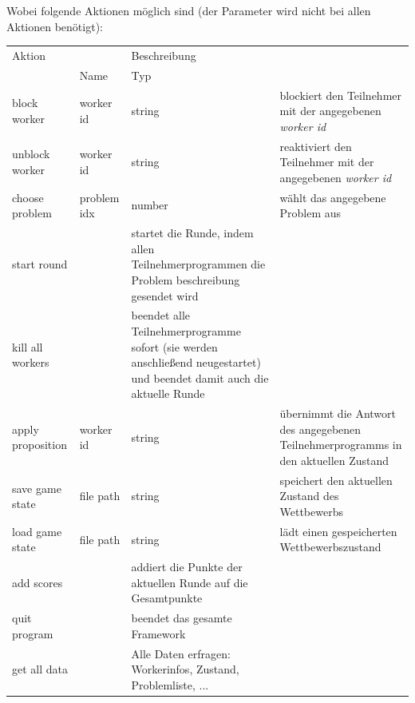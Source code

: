 \documentclass[a4paper, 12pt]{article}
\begin{document}
Wobei folgende Aktionen möglich sind (der Parameter wird nicht bei allen
Aktionen benötigt):
\par\begin{description}\item

\newcommand{\noparam}{\multicolumn{2}{c}{--- \textit{ohne Parameter} ---}}

\begin{tabularx}{\linewidth}{>{\ttfamily}l >{\ttfamily}l >{\ttfamily}l X}
  \normalfont Aktion & \multicolumn{2}{c}{Parameter} & Beschreibung \\
  & \normalfont Name & \normalfont Typ & \\
  \hline
  block worker      & worker id   & string & blockiert den Teilnehmer mit der
                                             angegebenen \textit{worker id} \\
  unblock worker    & worker id   & string & reaktiviert den Teilnehmer mit der
                                             angegebenen \textit{worker id} \\
  choose problem    & problem idx & number & wählt das angegebene Problem aus \\
  start round       & \noparam             & startet die Runde, indem allen
                                             Teilnehmerprogrammen die Problem\-%
                                             beschreibung gesendet wird \\
  kill all workers  & \noparam             & beendet alle Teilnehmerprogramme
                                             sofort (sie werden anschließend
                                             neugestartet) und beendet damit
                                             auch die aktuelle Runde \\
  apply proposition & worker id   & string & übernimmt die Antwort des
                                             angegebenen Teilnehmerprogramms in
                                             den aktuellen Zustand \\
  save game state   & file path   & string & speichert den aktuellen Zustand des
                                             Wettbewerbs \\
  load game state   & file path   & string & lädt einen gespeicherten
                                             Wettbewerbszustand \\
  add scores        & \noparam             & addiert die Punkte der aktuellen
                                             Runde auf die Gesamtpunkte \\
  quit program      & \noparam             & beendet das gesamte Framework \\
  get all data      & \noparam             & Alle Daten erfragen: Workerinfos,
                                             Zustand, Problemliste, ... \\
\end{tabularx}
\end{description}
\end{document}

